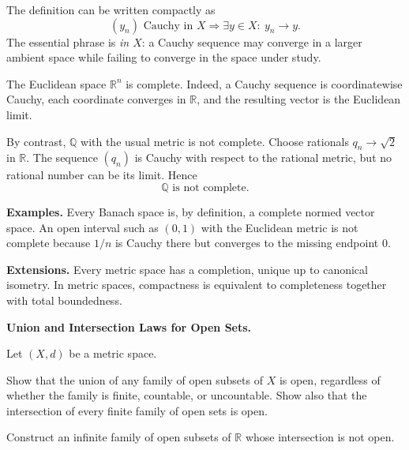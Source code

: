 \begin{solution}
The definition can be written compactly as
\[
\boxed{
(y_n)\text{ Cauchy in }X
\Longrightarrow
\exists y\in X:\ y_n\to y.}
\]
The essential phrase is \emph{in \(X\)}: a Cauchy sequence may converge in a
larger ambient space while failing to converge in the space under study.

The Euclidean space \(\mathbb R^n\) is complete. Indeed, a Cauchy sequence is
coordinatewise Cauchy, each coordinate converges in \(\mathbb R\), and the
resulting vector is the Euclidean limit.

By contrast, \(\mathbb Q\) with the usual metric is not complete. Choose
rationals \(q_n\to\sqrt2\) in \(\mathbb R\). The sequence \((q_n)\) is Cauchy
with respect to the rational metric, but no rational number can be its limit.
Hence
\[
\boxed{\mathbb Q\text{ is not complete}.}
\]

\medskip
\noindent\textbf{Examples.}
Every Banach space is, by definition, a complete normed vector space. An open
interval such as \((0,1)\) with the Euclidean metric is not complete because
\(1/n\) is Cauchy there but converges to the missing endpoint \(0\).

\medskip
\noindent\textbf{Extensions.}
Every metric space has a completion, unique up to canonical isometry. In metric
spaces, compactness is equivalent to completeness together with total
boundedness.
\end{solution}


\begin{problem}[CP-II-0548]
\label{prob:cp-ii-0548}
\textbf{Union and Intersection Laws for Open Sets.}

\hspace*{1.5em}Let \((X,d)\) be a metric space.

Show that the union of any family of open subsets of \(X\) is open, regardless
of whether the family is finite, countable, or uncountable. Show also that the
intersection of every finite family of open sets is open.

Construct an infinite family of open subsets of \(\mathbb R\) whose
intersection is not open.
\end{problem}

